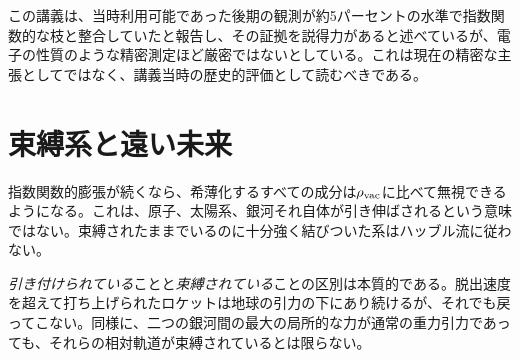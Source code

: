 この講義は、当時利用可能であった後期の観測が約5パーセントの水準で指数関数的な枝と整合していたと報告し、その証拠を説得力があると述べているが、電子の性質のような精密測定ほど厳密ではないとしている。これは現在の精密な主張としてではなく、講義当時の歴史的評価として読むべきである。

\begin{classroomqa}
\end{classroomqa}

\section{束縛系と遠い未来}

指数関数的膨張が続くなら、希薄化するすべての成分は\(\rho_{\rm vac}\)に比べて無視できるようになる。これは、原子、太陽系、銀河それ自体が引き伸ばされるという意味ではない。束縛されたままでいるのに十分強く結びついた系はハッブル流に従わない。

\begin{classroomqa}
\end{classroomqa}

\emph{引き付けられている}ことと\emph{束縛されている}ことの区別は本質的である。脱出速度を超えて打ち上げられたロケットは地球の引力の下にあり続けるが、それでも戻ってこない。同様に、二つの銀河間の最大の局所的な力が通常の重力引力であっても、それらの相対軌道が束縛されているとは限らない。

\begin{classroomqa}
\end{classroomqa}

